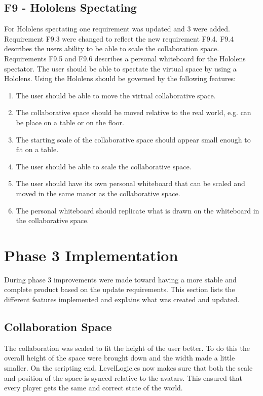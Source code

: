         \subsection{F9 - Hololens Spectating}
        For Hololens spectating one requirement was updated and 3 were added. Requirement F9.3 were changed to reflect the new requirement F9.4. F9.4 describes the users ability to be able to scale the collaboration space. Requirements F9.5 and F9.6 describes a personal whiteboard for the Hololens spectator.
        \newline\newline
        The user should be able to spectate the virtual space by using a Hololens. Using the Hololens should be governed by the following features:
        \begin{enumerate}
            \item The user should be able to move the virtual collaborative space.
            \item The collaborative space should be moved relative to the real world, e.g. can be place on a table or on the floor.
            \item The starting scale of the collaborative space should appear small enough to fit on a table.
            \item The user should be able to scale the collaborative space.
            \item The user should have its own personal whiteboard that can be scaled and moved in the same manor as the collaborative space.
            \item The personal whiteboard should replicate what is drawn on the whiteboard in the collaborative space.
        \end{enumerate}
    
    
    \section{Phase 3 Implementation} %
    During phase 3 improvements were made toward having a more stable and complete product based on the update requirements. This section lists the different features implemented and explains what was created and updated.
    
        \subsection{Collaboration Space}
        The collaboration was scaled to fit the height of the user better. To do this the overall height of the space were brought down and the width made a little smaller. On the scripting end, LevelLogic.cs now makes sure that both the scale and position of the space is synced relative to the avatars. This ensured that every player gets the same and correct state of the world.
        

